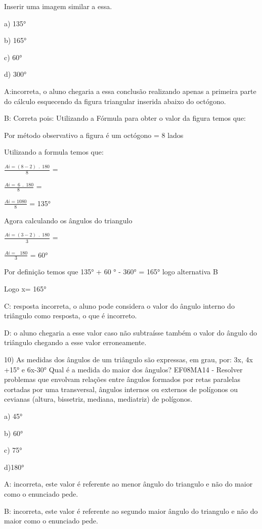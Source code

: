 Inserir uma imagem similar a essa.

a) 135°

b) 165°

c) 60°

d) 300°

A:incorreta, o aluno chegaria a essa conclusão realizando apenas a
primeira parte do cálculo esquecendo da figura triangular inserida
abaixo do octógono.

B: Correta pois: Utilizando a Fórmula para obter o valor da figura temos
que:

Por método observativo a figura é um octógono = 8 lados

Utilizando a formula temos que:

\(\frac{Ai = \left( 8 - 2 \right)\ \ .\ \ 180}{8}\) =

\(\frac{Ai = \ 6\ \ .\ \ 180}{8\ }\) =

\(\frac{Ai = 1080}{8}\) = 135°

Agora calculando os ângulos do triangulo

\(\frac{Ai = \left( 3 - 2 \right)\ \ .\ \ 180}{3}\) =

\(\frac{Ai = \ \ \ 180}{3}\) = 60°

Por definição temos que 135° + 60 ° - 360° = 165° logo alternativa B

Logo x= 165°

C: resposta incorreta, o aluno pode considera o valor do ângulo interno
do triângulo como resposta, o que é incorreto.

D: o aluno chegaria a esse valor caso não subtraísse também o valor do
ângulo do triângulo chegando a esse valor erroneamente.

10) As medidas dos ângulos de um triângulo são expressas, em grau, por:
3x, 4x +15° e 6x-30° Qual é a medida do maior dos ângulos? EF08MA14 -
Resolver problemas que envolvam relações entre ângulos formados por
retas paralelas cortadas por uma transversal, ângulos internos ou
externos de polígonos ou cevianas (altura, bissetriz, mediana,
mediatriz) de polígonos.

a) 45°

b) 60°

c) 75°

d)180°

A: incorreta, este valor é referente ao menor ângulo do triangulo e não
do maior como o enunciado pede.

B: incorreta, este valor é referente ao segundo maior ângulo do
triangulo e não do maior como o enunciado pede.

